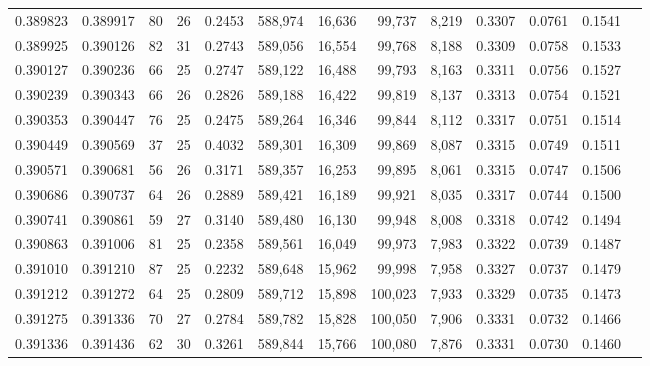 \begin{tabular}{rrrrrrrrrrrrr}
0.389823 & 0.389917 &    80 &  26 &                                     0.2453 & 588,974 &  16,636 &  99,737 &   8,219 & 0.3307 & 0.0761 & 0.1541 \\
0.389925 & 0.390126 &    82 &  31 &                                     0.2743 & 589,056 &  16,554 &  99,768 &   8,188 & 0.3309 & 0.0758 & 0.1533 \\
0.390127 & 0.390236 &    66 &  25 &                                     0.2747 & 589,122 &  16,488 &  99,793 &   8,163 & 0.3311 & 0.0756 & 0.1527 \\
0.390239 & 0.390343 &    66 &  26 &                                     0.2826 & 589,188 &  16,422 &  99,819 &   8,137 & 0.3313 & 0.0754 & 0.1521 \\
0.390353 & 0.390447 &    76 &  25 &                                     0.2475 & 589,264 &  16,346 &  99,844 &   8,112 & 0.3317 & 0.0751 & 0.1514 \\
0.390449 & 0.390569 &    37 &  25 &                                     0.4032 & 589,301 &  16,309 &  99,869 &   8,087 & 0.3315 & 0.0749 & 0.1511 \\
0.390571 & 0.390681 &    56 &  26 &                                     0.3171 & 589,357 &  16,253 &  99,895 &   8,061 & 0.3315 & 0.0747 & 0.1506 \\
0.390686 & 0.390737 &    64 &  26 &                                     0.2889 & 589,421 &  16,189 &  99,921 &   8,035 & 0.3317 & 0.0744 & 0.1500 \\
0.390741 & 0.390861 &    59 &  27 &                                     0.3140 & 589,480 &  16,130 &  99,948 &   8,008 & 0.3318 & 0.0742 & 0.1494 \\
0.390863 & 0.391006 &    81 &  25 &                                     0.2358 & 589,561 &  16,049 &  99,973 &   7,983 & 0.3322 & 0.0739 & 0.1487 \\
0.391010 & 0.391210 &    87 &  25 &                                     0.2232 & 589,648 &  15,962 &  99,998 &   7,958 & 0.3327 & 0.0737 & 0.1479 \\
0.391212 & 0.391272 &    64 &  25 &                                     0.2809 & 589,712 &  15,898 & 100,023 &   7,933 & 0.3329 & 0.0735 & 0.1473 \\
0.391275 & 0.391336 &    70 &  27 &                                     0.2784 & 589,782 &  15,828 & 100,050 &   7,906 & 0.3331 & 0.0732 & 0.1466 \\
0.391336 & 0.391436 &    62 &  30 &                                     0.3261 & 589,844 &  15,766 & 100,080 &   7,876 & 0.3331 & 0.0730 & 0.1460 \\

\end{tabular}
